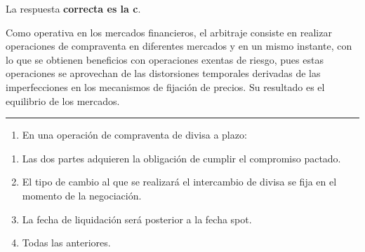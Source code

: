 \documentclass[
  letterpaper,
  DIV=11,
  numbers=noendperiod]{scrreprt}
\providecommand{\tightlist}{%
  \setlength{\itemsep}{0pt}\setlength{\parskip}{0pt}}\usepackage{longtable,booktabs,array}
\begin{document}
\begin{tcolorbox}[enhanced jigsaw, left=2mm, opacityback=0, colback=white, breakable, arc=.35mm, bottomrule=.15mm, rightrule=.15mm, toprule=.15mm, leftrule=.75mm, colframe=quarto-callout-tip-color-frame]
\begin{minipage}[t]{5.5mm}
\textcolor{quarto-callout-tip-color}{\faLightbulb}
\end{minipage}%
\begin{minipage}[t]{\textwidth - 5.5mm}

La respuesta \textbf{correcta es la c}.

Como operativa en los mercados financieros, el arbitraje consiste en
realizar operaciones de compraventa en diferentes mercados y en un mismo
instante, con lo que se obtienen beneficios con operaciones exentas de
riesgo, pues estas operaciones se aprovechan de las distorsiones
temporales derivadas de las imperfecciones en los mecanismos de fijación
de precios. Su resultado es el equilibrio de los mercados.

\end{minipage}%
\end{tcolorbox}

\begin{center}\rule{0.5\linewidth}{0.5pt}\end{center}

\begin{enumerate}
\def\labelenumi{\arabic{enumi}.}
\setcounter{enumi}{5}
\tightlist
\item
  En una operación de compraventa de divisa a plazo:
\end{enumerate}

\begin{enumerate}
\def\labelenumi{\alph{enumi})}
\item
  Las dos partes adquieren la obligación de cumplir el compromiso
  pactado.
\item
  El tipo de cambio al que se realizará el intercambio de divisa se fija
  en el momento de la negociación.
\item
  La fecha de liquidación será posterior a la fecha spot.
\item
  Todas las anteriores.
\end{enumerate}
\end{document}
